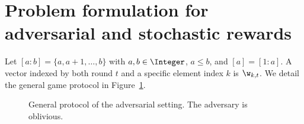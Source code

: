 \section{Problem formulation for adversarial and stochastic rewards}
\label{s:set}
%
Let $[a:b]=\{a,a+1,\ldots,b\}$ with
$a,b\in\Integer$, $a\leq b$, and $[a]=[1:a]$.
A vector indexed by both round $t$ and a specific element
index $k$ is $\w_{k,t}$. We detail the general game protocol in Figure~\ref{fig:protocol}.
%
%
\begin{figure}[H]
\centering
{}
\caption{General protocol of the adversarial setting. The adversary 
	is oblivious.}\label{fig:protocol}
\end{figure}
%
